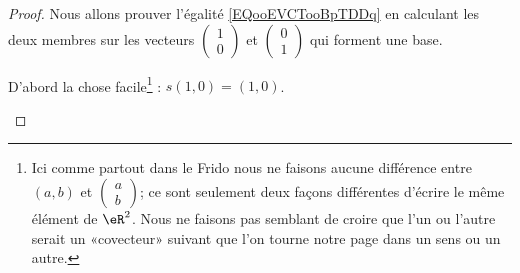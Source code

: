 \begin{proof}
	Nous allons prouver l'égalité \eqref{EQooEVCTooBpTDDq} en calculant les deux membres sur les vecteurs \( \begin{pmatrix}
		1 \\
		0
	\end{pmatrix}\) et \( \begin{pmatrix}
		0 \\
		1
	\end{pmatrix}\) qui forment une base.

	\begin{subproof}
		\spitem[Pour \( p=(1,0)\)]
		D'abord la chose facile\footnote{Ici comme partout dans le Frido nous ne faisons aucune différence entre \( (a,b)\) et \( \begin{pmatrix}
				a \\
				b
			\end{pmatrix}\); ce sont seulement deux façons différentes d'écrire le même élément de \( \eR^2\). Nous ne faisons pas semblant de croire que l'un ou l'autre serait un «covecteur» suivant que l'on tourne notre page dans un sens ou un autre.} : \( s(1,0)=(1,0)\).


\end{subproof}
\end{proof}
